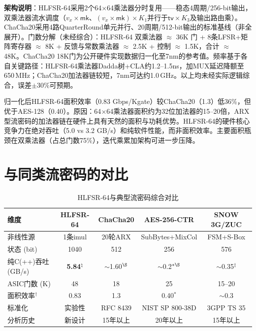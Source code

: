 \documentclass[11pt,a4paper]{ctexart}
\begin{document}
\textbf{架构说明}：HLFSR-64采用2个64$\times$64乘法器分时复用——稳态4周期/256-bit输出，双乘法器流水调度（$v_x\times\mathsf{mk}$、$(v_x\times\mathsf{mk})\times K_1$并行于$\mathsf{tv}\times K_3$及输出路由乘）。ChaCha20采用4路QuarterRound单元并行、20周期/512-bit输出的标准基线（非全展开）。门数分解（未经综合）：HLFSR-64 双乘法器 $\approx$ 36K 门 + 8条LFSR+矩阵寄存器 $\approx$ 8K + 反馈与常数乘法器 $\approx$ 2.5K + 控制 $\approx$ 1.5K，合计 $\approx$ 48K。ChaCha20 18K门为公开硬件实现数据归一化至7nm的参考值。频率基于各自关键路径：HLFSR-64乘法器Dadda树+CLA约1.2--1.5ns，加MUX延迟降额至650\,MHz；ChaCha20加法器链较短，7nm可达约1.0\,GHz。以上均未经实际逻辑综合，误差$\pm$30\%可预期。

归一化后HLFSR-64面积效率（0.83 Gbps/Kgate）较ChaCha20（1.3）低36\%，但优于AES-128（0.40）。原因：64$\times$64乘法器面积约为32位加法器的15--20倍，ARX型流密码的加法器链在硬件上具有天然的面积与功耗优势。HLFSR-64的硬件核心竞争力在绝对吞吐（5.0 vs 3.2 GB/s）和纯软件性能，而非面积效率。主要面积瓶颈在双乘法器（占总门数75\%），迭代乘累加架构可进一步压降。

\clearpage
\section{与同类流密码的对比}

\begin{table}[H]
\centering
\footnotesize
\begin{tabular}{@{}lcccc@{}}
\toprule
\textbf{维度} & \textbf{HLFSR-64} & \textbf{ChaCha20} & \textbf{AES-256-CTR} & \textbf{SNOW 3G/ZUC} \\
\midrule
非线性源       & 1条imul       & 20轮ARX      & SubBytes+MixCol & FSM+S-Box \\
状态 (bit)     & 1040          & 512          & 256             & 576 \\
纯C(++)吞吐 (GB/s) & \textbf{5.84}$^\natural$ & $\sim$1.60$^\S$ & $\sim$0.2$^{*\S}$ & $\sim$0.35$^\ddag$ \\
ASIC门数 (K)   & 48            & 18           & 25              & 15--20 \\
面积效率$^\dagger$ & 0.83 & 1.3         & 0.40$^*$        & $\sim$0.3 \\
标准化         & 实验性         & RFC 8439     & NIST SP 800-38D & 3GPP TS 35 \\
分析历史       & 新设计          & 15年以上      & 20年以上          & 15年以上 \\
\bottomrule
\end{tabular}
\caption{HLFSR-64与典型流密码综合对比}
\label{tab:comparison}
\end{table}
\end{document}

